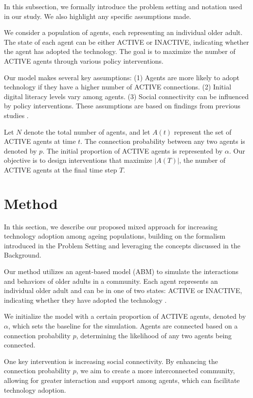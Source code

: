 \documentclass{article} %
\begin{document}
In this subsection, we formally introduce the problem setting and notation used in our study. We also highlight any specific assumptions made.

We consider a population of agents, each representing an individual older adult. The state of each agent can be either ACTIVE or INACTIVE, indicating whether the agent has adopted the technology. The goal is to maximize the number of ACTIVE agents through various policy interventions.

Our model makes several key assumptions: (1) Agents are more likely to adopt technology if they have a higher number of ACTIVE connections. (2) Initial digital literacy levels vary among agents. (3) Social connectivity can be influenced by policy interventions. These assumptions are based on findings from previous studies \citep{wang2023describe}.

Let \( N \) denote the total number of agents, and let \( A(t) \) represent the set of ACTIVE agents at time \( t \). The connection probability between any two agents is denoted by \( p \). The initial proportion of ACTIVE agents is represented by \( \alpha \). Our objective is to design interventions that maximize \( |A(T)| \), the number of ACTIVE agents at the final time step \( T \).

\section{Method}
\label{sec:method}

In this section, we describe our proposed mixed approach for increasing technology adoption among ageing populations, building on the formalism introduced in the Problem Setting and leveraging the concepts discussed in the Background.

Our method utilizes an agent-based model (ABM) to simulate the interactions and behaviors of older adults in a community. Each agent represents an individual older adult and can be in one of two states: ACTIVE or INACTIVE, indicating whether they have adopted the technology \citep{liu2023agentbench}.

We initialize the model with a certain proportion of ACTIVE agents, denoted by \( \alpha \), which sets the baseline for the simulation. Agents are connected based on a connection probability \( p \), determining the likelihood of any two agents being connected.

One key intervention is increasing social connectivity. By enhancing the connection probability \( p \), we aim to create a more interconnected community, allowing for greater interaction and support among agents, which can facilitate technology adoption.
\end{document}
